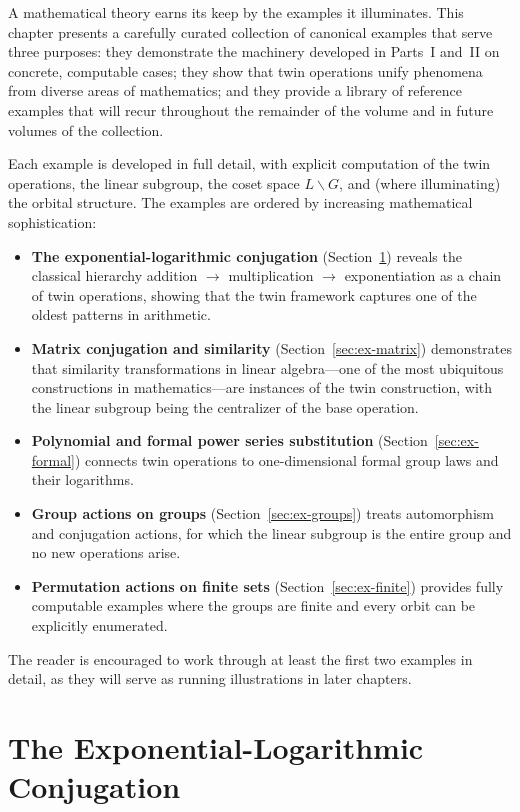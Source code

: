 \documentclass[11pt,a4paper,openany]{book}
\theoremstyle{plain}
\theoremstyle{definition}
\newcommand{\lingroup}{L}
\newcommand{\groupG}{G}
\begin{document}
A mathematical theory earns its keep by the examples it illuminates. This chapter presents a carefully curated collection of canonical examples that serve three purposes: they demonstrate the machinery developed in Parts~I and~II on concrete, computable cases; they show that twin operations unify phenomena from diverse areas of mathematics; and they provide a library of reference examples that will recur throughout the remainder of the volume and in future volumes of the collection.

Each example is developed in full detail, with explicit computation of the twin operations, the linear subgroup, the coset space $\lingroup\backslash\groupG$, and (where illuminating) the orbital structure. The examples are ordered by increasing mathematical sophistication:

\begin{itemize}
    \item \textbf{The exponential-logarithmic conjugation} (Section~\ref{sec:ex-explog}) reveals the classical hierarchy addition $\to$ multiplication $\to$ exponentiation as a chain of twin operations, showing that the twin framework captures one of the oldest patterns in arithmetic.
    \item \textbf{Matrix conjugation and similarity} (Section~\ref{sec:ex-matrix}) demonstrates that similarity transformations in linear algebra---one of the most ubiquitous constructions in mathematics---are instances of the twin construction, with the linear subgroup being the centralizer of the base operation.
    \item \textbf{Polynomial and formal power series substitution} (Section~\ref{sec:ex-formal}) connects twin operations to one-dimensional formal group laws and their logarithms.
    \item \textbf{Group actions on groups} (Section~\ref{sec:ex-groups}) treats automorphism and conjugation actions, for which the linear subgroup is the entire group and no new operations arise.
    \item \textbf{Permutation actions on finite sets} (Section~\ref{sec:ex-finite}) provides fully computable examples where the groups are finite and every orbit can be explicitly enumerated.
\end{itemize}

The reader is encouraged to work through at least the first two examples in detail, as they will serve as running illustrations in later chapters.

\section{The Exponential-Logarithmic Conjugation}\label{sec:ex-explog}
\end{document}
